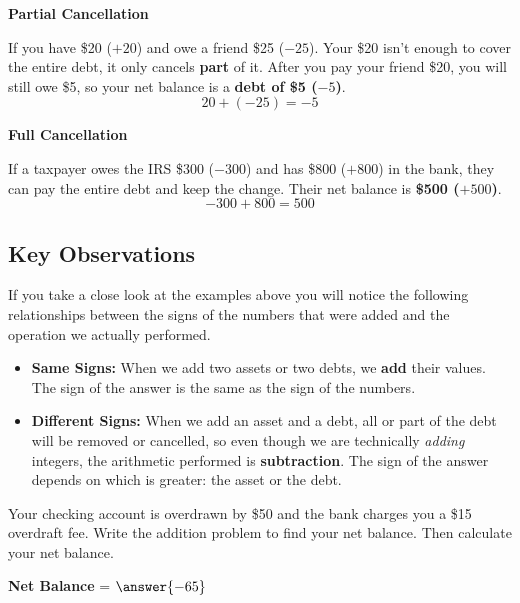 \documentclass{ximera}[font=12pt]
\begin{document}
\begin{example} \textcolor{glaucous}{\textbf{Partial Cancellation}}  
    
    If you have \$20 ($+20$) and owe a friend \$25 ($-25$).  Your \$20 isn't enough to 
    cover the entire debt, it only cancels \textbf{part} of it.  After you pay your friend \$20, you will still owe \$5, so
    your net balance is a \textbf{debt of \$5 ($-5$)}.
    \[ 20 + (-25) = -5 \]
\end{example}

\begin{example} \textcolor{glaucous}{\textbf{Full Cancellation}} 
    
    If a taxpayer owes the IRS \$300 ($-300$) and has \$800 ($+800$) in the bank, they can pay the 
    entire debt and keep the change.  Their net balance is \textbf{\$500 ($+500$)}.
    \[ -300 + 800 = 500 \]
\end{example}


\subsection*{Key Observations}

If you take a close look at the examples above you will notice the following relationships between the signs of the numbers that were added and the 
operation we actually performed.


\begin{itemize}
    \item[] \textbf{Same Signs:} When we add two assets or two debts, we \textbf{add} their values.  The sign of the answer is the 
    same as the sign of the numbers.

    \item[] \textbf{Different Signs:} When we add an asset and a debt, all or part of the debt will be removed or cancelled, 
    so even though we are technically \emph{adding} integers, the arithmetic performed is \textbf{subtraction}.  The sign of 
    the answer depends on which is greater: the asset or the debt.
\end{itemize}



\begin{problem}
Your checking account is overdrawn by \$50 and the bank charges you a \$15 overdraft fee.  Write the addition problem to find your 
net balance.  Then calculate your net balance. 


\begin{multipleChoice}
\end{multipleChoice}


\textcolor{orange!75!black}{\textbf{Net Balance}} = $\answer{-65}$

\end{problem}
\end{document}
